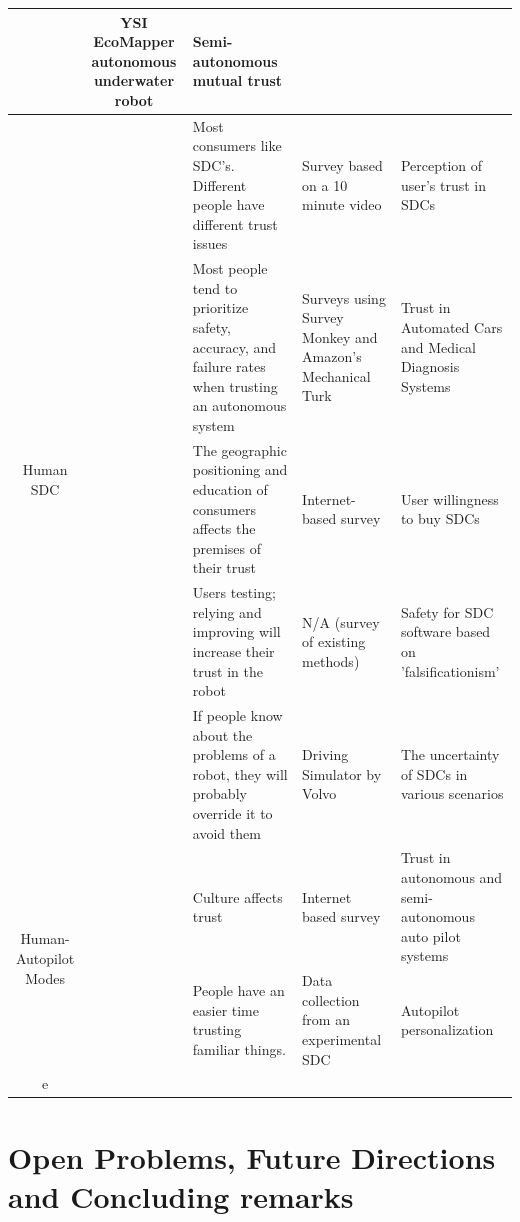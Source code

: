 \documentclass[runningheads,a4paper]{llncs}
\begin{document}
\begin{center}
\begin{longtable}{|c|c|p{4cm}|p{2cm}|p{2cm}|}
	& YSI EcoMapper autonomous underwater robot         
	& Semi-autonomous mutual trust
	\\ \hline
\multirow{5}{*}{Human SDC}      
	& \cite{howard2014public}  
	& Most consumers like SDC's. Different people have different trust issues                     
	& Survey based on a 10 minute video                        
	& Perception of user's trust in SDCs
	\\ \cline{2-5} 
	& \cite{carlson2014identifying}
	& Most people tend to prioritize safety, accuracy, and failure rates when trusting an autonomous system                       
	& Surveys using  Survey Monkey and Amazon’s Mechanical Turk                  
	& Trust in Automated Cars and Medical Diagnosis Systems               
	\\ \cline{2-5} 
	& \cite{kyriakidis2015public}
	& The geographic positioning and education of consumers affects the premises of their trust 
	& Internet-based survey                    
	& User willingness to buy SDCs
	\\ \cline{2-5} 
	& \cite{wagner2015philosophy}    
	& Users testing; relying and improving will increase their trust in the robot 
	& N/A (survey of existing methods)         
	& Safety for SDC software based on 'falsificationism'
	\\ \cline{2-5} 
	& \cite{helldin2013presenting}
	& If people know about the problems of a robot, they will probably override it to avoid them            
	& Driving Simulator by Volvo  
	& The uncertainty of SDCs in various scenarios            
	\\ \hline
	
	\multirow{2}{*}{Human-Autopilot Modes}    
	& \cite{winter2015indian}
	& Culture affects trust                        
	& Internet based survey               
	& Trust in autonomous and semi-autonomous auto pilot systems        
	\\ \cline{2-5} 
	& \cite{butakov2015driving}
	& People have an easier time trusting familiar things.                   
	& Data collection from an experimental SDC
	& Autopilot personalization
	\\ \hline
	
e

\end{longtable}
\end{center}

\section{Open Problems, Future Directions and Concluding remarks}
%

\end{document}
